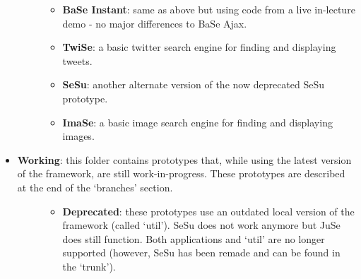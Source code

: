 \documentclass[letterpaper,10pt,english]{sphinxmanual}
\begin{document}
\begin{itemize}
\begin{description}
\begin{itemize}
\item {} 
\textbf{BaSe Instant}: same as above but using code from a live in-lecture demo - no major differences to BaSe Ajax.

\item {} 
\textbf{TwiSe}: a basic twitter search engine for finding and displaying tweets.

\item {} 
\textbf{SeSu}: another alternate version of the now deprecated SeSu prototype.

\item {} 
\textbf{ImaSe}: a basic image search engine for finding and displaying images.

\end{itemize}

\end{description}

\item {} \begin{description}
\item[{\textbf{Working}: this folder contains prototypes that, while using the latest version of the framework, are still work-in-progress. These prototypes are described at the end of the `branches' section.}] \leavevmode\begin{itemize}
\item {} 
\textbf{Deprecated}: these prototypes use an outdated local version of the framework (called `util'). SeSu does not work anymore but JuSe does still function. Both applications and `util' are no longer supported (however, SeSu has been remade and can be found in the `trunk').

\end{itemize}

\end{description}

\end{itemize}
\end{document}
